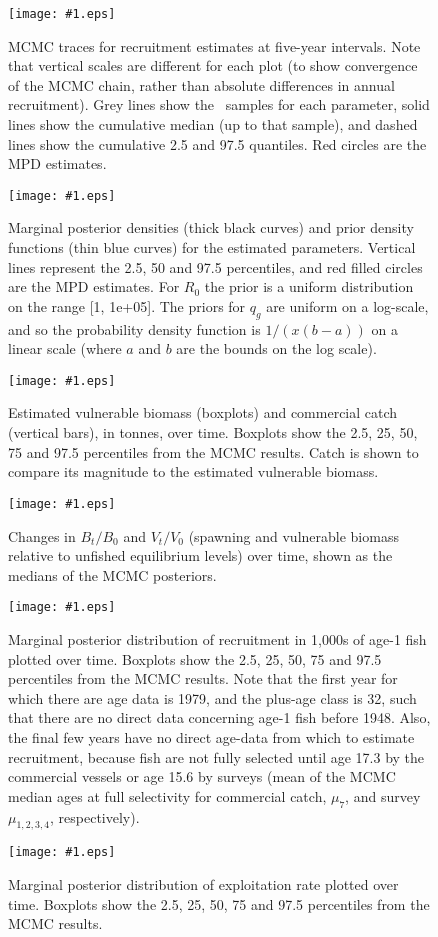\documentclass[11pt]{book}
\newcommand\onefig[2]{    %
  \begin{figure}[!htp]
  \begin{center}
	\texttt{[image: \#1.eps]} \\  %
  \end{center}
  \caption{#2 }
  \label{fig:#1} 
  \end{figure}
}
\begin{document}
\onefig{traceRecruits}{MCMC traces for recruitment estimates at five-year intervals. Note that vertical scales are different for each plot (to show convergence of the MCMC chain, rather than absolute differences in annual recruitment). Grey lines show the \numMCMC~samples for each parameter, solid lines show the cumulative  median (up to that sample), and dashed lines show the cumulative  2.5 and 97.5 quantiles.  Red circles are the MPD estimates.}

\onefig{pdfParameters}{Marginal posterior densities (thick black curves) and prior density functions (thin blue curves) for the estimated parameters. Vertical lines represent the 2.5, 50 and 97.5 percentiles, and red filled circles are the MPD estimates. For $R_0$ the prior is a uniform distribution on the range [1, 1e+05]. The priors for $q_g$ are uniform on a log-scale, and so the probability density function is $1/(x(b-a))$ on a linear scale (where $a$ and $b$ are the bounds on the log scale).}

\clearpage










\onefig{VBcatch}{Estimated vulnerable biomass (boxplots) and commercial catch (vertical bars), in tonnes, over time. Boxplots show the 2.5, 25, 50, 75 and 97.5 percentiles from the MCMC results. Catch is shown to compare its magnitude to the estimated vulnerable biomass.}

\onefig{BVBnorm}{Changes in $B_t / B_0$ and $V_t / V_0$ (spawning and vulnerable biomass relative to unfished equilibrium levels) over time, shown as the medians of the MCMC posteriors.}


\onefig{recruitsMCMC}{Marginal posterior distribution of recruitment in 1,000s of age-1 fish plotted over time. Boxplots show the 2.5, 25, 50, 75 and 97.5 percentiles from the MCMC results. Note that the first year for which there are age data is 1979, and the plus-age class is 32, such that there are no direct data concerning age-1 fish before 1948. Also, the final few years have no direct age-data from which to estimate recruitment, because fish are not fully selected until age 17.3 by the commercial vessels or age 15.6 by surveys (mean of the MCMC median ages at full selectivity for commercial catch, $\mu_{7}$, and survey $\mu_{1,2,3,4}$, respectively).}

\onefig{exploitMCMC}{Marginal posterior distribution of exploitation rate plotted over time. Boxplots show the 2.5, 25, 50, 75 and 97.5 percentiles from the MCMC results.}
\end{document}
